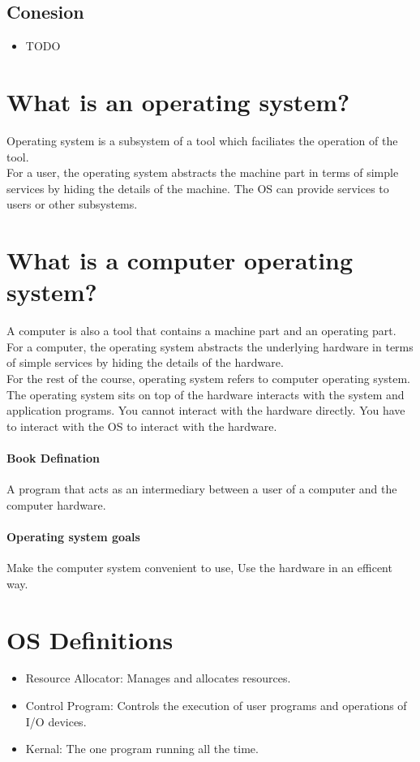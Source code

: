 \subsection{Conesion}

\begin{itemize}
    \item TODO 
\end{itemize}

\section{What is an operating system?}

Operating system is a subsystem of a tool which faciliates the
operation of the tool.\\

For a user, the operating system abstracts the machine part
in terms of simple services by hiding the details of the machine.
The OS can provide services to users or other subsystems.

\section{What is a computer operating system?}

A computer is also a tool that contains a machine part and an
operating part. For a computer, the operating system abstracts
the underlying hardware in terms of simple services by hiding
the details of the hardware.\\

For the rest of the course, operating system refers to computer
operating system.\\

The operating system sits on top of the hardware interacts with
the system and application programs. You cannot interact with
the hardware directly. You have to interact with the OS to interact
with the hardware.\\

\paragraph{Book Defination}
A program that acts as an intermediary between a user of a 
computer and the computer hardware.

\paragraph{Operating system goals}
Make the computer system convenient to use, Use the hardware in
an efficent way.

\section{OS Definitions}

\begin{itemize}
    \item Resource Allocator: Manages and allocates resources.
    \item Control Program: Controls the execution of user programs
        and operations of I/O devices.
    \item Kernal: The one program running all the time.
\end{itemize}
